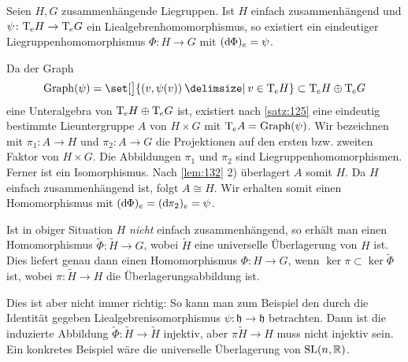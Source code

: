 \begin{lemma}[label=lem:134]
	Seien $H,G$ zusammenhängende Liegruppen.
	Ist $H$ einfach zusammenhängend und $\psi \colon \mathrm{T}\mkern-0.85mu_e H \to \mathrm{T}\mkern-0.85mu_e G$ ein Liealgebrenhomomorphismus, so existiert ein eindeutiger Liegruppenhomomorphismus $\Phi \colon H \to G$ mit $(\mathrm{d}\mkern-1.0mu \Phi)_e = \psi$.
\end{lemma}
\begin{beweis}
	Da der Graph
	\[
		\Graph(\psi) = \set[\big]{\enbrace*{v,\psi(v)} \given v \in \Tmap_e H} \subset \Tmap_e H \oplus \Tmap_e G
	\]
	eine Unteralgebra von $\mathrm{T}\mkern-0.85mu_e H \oplus \mathrm{T}\mkern-0.85mu_e G$ ist, existiert nach \autoref{satz:125} eine eindeutig bestimmte Lieuntergruppe $A$ von $H \times G$ mit $\mathrm{T}\mkern-0.85mu_e A = \operatorname{Graph}(\psi)$.
	Wir bezeichnen mit $\pi_1 \colon A \to H$ und $\pi_2 \colon A \to G$ die Projektionen auf den ersten bzw. zweiten Faktor von $H \times G$.
	Die Abbildungen $\pi_1$ und $\pi_2$ sind Liegruppenhomomorphismen.
	Ferner ist 
	ein Isomorphismus.
	Nach \autoref{lem:132} 2) überlagert $A$ somit $H$.
	Da $H$ einfach zusammenhängend ist, folgt $A \cong H$.
	Wir erhalten somit einen Homomorphismus 
	mit $(\mathrm{d}\mkern-1.0mu \Phi)_e = (\mathrm{d}\mkern-1.0mu \pi_2)_e = \psi$.
\end{beweis}

Ist in obiger Situation $H$ \emph{nicht} einfach zusammenhängend, so erhält man einen Homomorphismus $\tilde{\Phi} \colon \tilde{H} \to G$, wobei $\tilde{H}$ eine universelle Überlagerung von $H$ ist.
Dies liefert genau dann einen Homomorphismus $\Phi \colon H \to G$, wenn $\ker \pi \subset \ker \tilde{\Phi}$ ist, wobei $\pi \colon \tilde{H} \to H$ die Überlagerungsabbildung ist.

Dies ist aber nicht immer richtig:
So kann man zum Beispiel den durch die Identität gegeben Liealgebrenisomorphismus $\psi \colon \mathfrak{h} \to \mathfrak{h}$ betrachten.
Dann ist die induzierte Abbildung $\tilde{\Phi} \colon \tilde{H} \to \tilde{H}$ injektiv, aber $\pi \tilde{H} \to H$ muss nicht injektiv sein.
Ein konkretes Beispiel wäre die universelle Überlagerung von $\operatorname{SL}(n,\mathbb{R})$.

